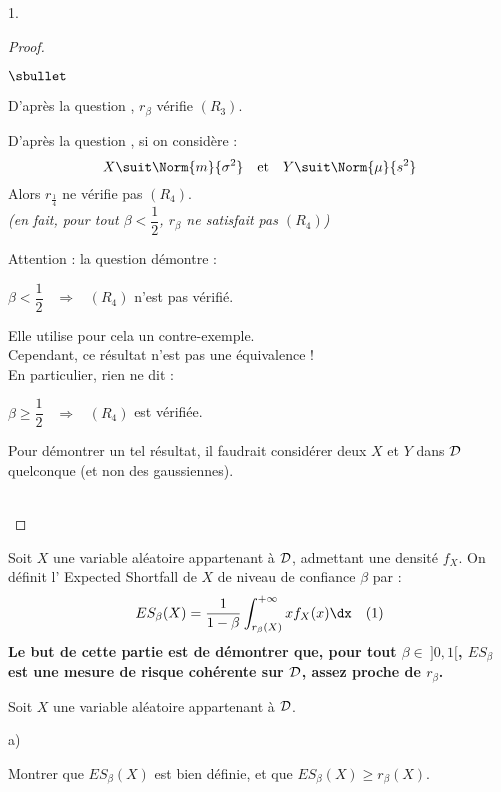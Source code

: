 \begin{noliste}{1.}
\begin{proof}
\begin{noliste}{$\sbullet$}
      \item D'après la question , $r_\beta$ vérifie $(R_3)$.
      
      \item D'après la question , si on considère :
      \[
        X \suit \Norm{m}{\sigma^2} \quad \text{et} \quad 
        Y \suit \Norm{\mu}{s^2}
      \]
      Alors $r_{\frac{1}{4}}$ ne vérifie pas $(R_4)$.\\
      {\it (en fait, pour tout $\beta < \dfrac{1}{2}$, $r_\beta$ ne 
      satisfait pas $(R_4)$)}
    \end{noliste}
    \conc{On en déduit que $r_\beta$ n'est pas une mesure de risque
    cohérente pour tout $\beta \in \ ]0,1[$.}
    
    \begin{remark}
      Attention : la question  démontre :
      \begin{center}
        $\beta <\dfrac{1}{2}$ \ $\Rightarrow$ \ $(R_4)$ n'est pas 
	vérifié.
      \end{center}
      Elle utilise pour cela un contre-exemple.\\
      Cependant, ce résultat n'est pas une équivalence !\\
      En particulier, rien ne dit :
      \begin{center}
        $\beta \geq \dfrac{1}{2}$ \ $\Rightarrow$ \ $(R_4)$ est 
	vérifiée.
      \end{center}
      Pour démontrer un tel résultat, il faudrait considérer deux \var 
      $X$ et $Y$ dans ${\cal D}$ quelconque (et non des \var 
      gaussiennes).
    \end{remark}~\\[-1.4cm]
  \end{proof}

  Soit $X$ une variable aléatoire appartenant à ${\cal D}$, 
  admettant une densité $f_X$. On définit l' \og Expected 
  Shortfall\fg{} de $X$ de niveau de confiance $\beta$ par :
  \[
    ES_\beta(X)=\dfrac1{1-\beta} \int_{r_\beta(X)}^{+\infty} x 
    f_X(x) \dx \quad(1)
  \]
  {\bf Le but de cette partie est de démontrer que, pour tout 
  $\beta \in \ ]0,1[$, $ES_\beta$ est une mesure de risque cohérente 
  sur ${\cal D}$, assez \og proche \fg{} de $r_\beta$.}
  
  \item Soit $X$ une variable aléatoire appartenant à ${\cal D}$.
  \begin{noliste}{a)}
    \setlength{\itemsep}{2mm}
    \item Montrer que $ES_\beta(X)$ est bien définie, et que 
    $ES_\beta(X) \geq r_\beta(X)$.
    

\end{noliste}
\end{noliste}
